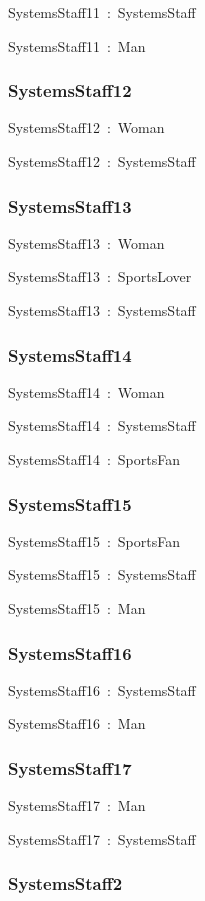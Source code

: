 \documentclass{article}
\begin{document}
SystemsStaff11~:~SystemsStaff

SystemsStaff11~:~Man

\subsubsection*{SystemsStaff12}

SystemsStaff12~:~Woman

SystemsStaff12~:~SystemsStaff

\subsubsection*{SystemsStaff13}

SystemsStaff13~:~Woman

SystemsStaff13~:~SportsLover

SystemsStaff13~:~SystemsStaff

\subsubsection*{SystemsStaff14}

SystemsStaff14~:~Woman

SystemsStaff14~:~SystemsStaff

SystemsStaff14~:~SportsFan

\subsubsection*{SystemsStaff15}

SystemsStaff15~:~SportsFan

SystemsStaff15~:~SystemsStaff

SystemsStaff15~:~Man

\subsubsection*{SystemsStaff16}

SystemsStaff16~:~SystemsStaff

SystemsStaff16~:~Man

\subsubsection*{SystemsStaff17}

SystemsStaff17~:~Man

SystemsStaff17~:~SystemsStaff

\subsubsection*{SystemsStaff2}
\end{document}
